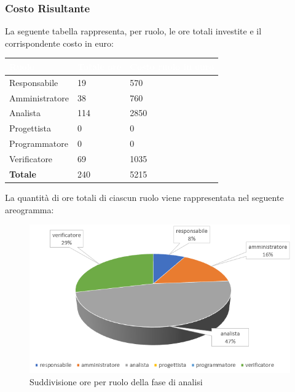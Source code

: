\clearpage
\subsubsection{Costo Risultante}
La seguente tabella rappresenta, per ruolo, le ore totali investite e il corrispondente costo in euro:
{
\renewcommand{\arraystretch}{2}
\begin{table}[h]
\centering
\caption{Tabella del costo risultante di Analisi}
\begin{longtable}{ C{3cm} C{2cm} C{4cm}}
	\textcolor{white}{\textbf{Ruolo}} & 
	\textcolor{white}{\textbf{Totale ore}} & 
	\textcolor{white}{\textbf{Costo ruolo in euro}}\\	
\endhead
      
        Responsabile & 19 & 570\\
        Amministratore & 38 & 760\\
        Analista & 114 & 2850 \\
        Progettista & 0 & 0 \\
        Programmatore & 0 & 0 \\
        Verificatore & 69 & 1035 \\
        \textbf{Totale} & 240 & 5215 \\
		
	\end{longtable}
\end{table}
}
\newline
La quantità di ore totali di ciascun ruolo viene rappresentata nel seguente areogramma:

\begin{figure}[h]
\centering
	\caption{Suddivisione ore per ruolo della fase di analisi}
	\includegraphics[scale=2]{sezioni/Aerogrammi/AerogrammaAnalisi.png}
\end{figure}
\clearpage

